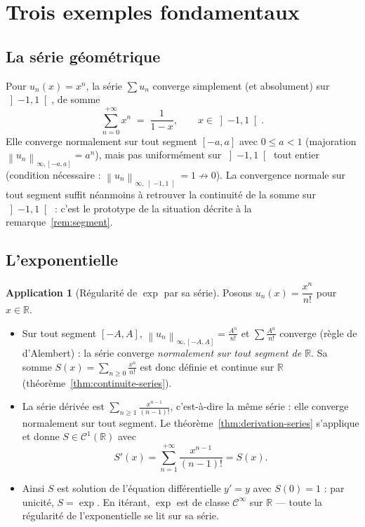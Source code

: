 \documentclass[11pt,a4paper]{article}
\theoremstyle{plain}
\theoremstyle{definition}
\newtheorem{application}[theoreme]{Application}
\theoremstyle{remark}
\newcommand{\R}{\mathbb{R}}
\newcommand{\Ninf}[2]{\left\lVert #1 \right\rVert_{\infty,#2}}
\numberwithin{equation}{section}
\begin{document}
\section{Trois exemples fondamentaux}

\subsection{La série géométrique}

Pour $u_n(x)=x^n$, la série $\sum u_n$ converge simplement (et
absolument) sur $\left]-1,1\right[$, de somme
\[
    \sum_{n=0}^{+\infty} x^n \;=\; \frac{1}{1-x},
    \qquad x\in\left]-1,1\right[ .
\]
Elle converge normalement sur tout segment $[-a,a]$ avec $0\leq a<1$
(majoration $\Ninf{u_n}{[-a,a]}=a^n$), mais pas uniformément sur
$\left]-1,1\right[$ tout entier (condition nécessaire :
$\Ninf{u_n}{\left]-1,1\right[}=1\not\to 0$). La convergence normale sur
tout segment suffit néanmoins à retrouver la continuité de la somme sur
$\left]-1,1\right[$ : c'est le prototype de la situation décrite à la
remarque~\ref{rem:segment}.

\subsection{L'exponentielle}

\begin{application}[Régularité de $\exp$ par sa série]\label{app:exp}
Posons $u_n(x)=\dfrac{x^n}{n!}$ pour $x\in\R$.
\begin{itemize}
    \item Sur tout segment $[-A,A]$, $\Ninf{u_n}{[-A,A]} = \frac{A^n}{n!}$
    et $\sum\frac{A^n}{n!}$ converge (règle de d'Alembert) : la série
    converge \emph{normalement sur tout segment de $\R$}. Sa somme
    $S(x)=\sum_{n\geq 0}\frac{x^n}{n!}$ est donc définie et continue sur
    $\R$ (théorème~\ref{thm:continuite-series}).
    \item La série dérivée est $\sum_{n\geq 1}\frac{x^{n-1}}{(n-1)!}$,
    c'est-à-dire la même série : elle converge normalement sur tout
    segment. Le théorème~\ref{thm:derivation-series} s'applique et donne
    $S\in\mathcal{C}^1(\R)$ avec
    \[
        S'(x) = \sum_{n=1}^{+\infty}\frac{x^{n-1}}{(n-1)!} = S(x) .
    \]
    \item Ainsi $S$ est solution de l'équation différentielle $y'=y$ avec
    $S(0)=1$ : par unicité, $S=\exp$. En itérant, $\exp$ est de classe
    $\mathcal{C}^\infty$ sur $\R$ --- toute la régularité de
    l'exponentielle se lit sur sa série.
\end{itemize}
\end{application}
\end{document}

